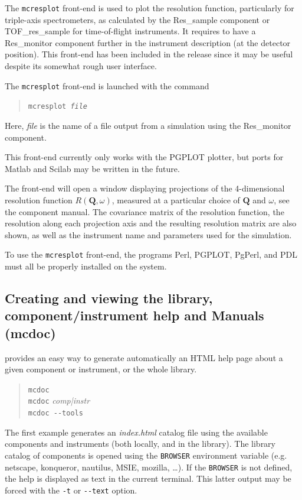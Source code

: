 The \verb+mcresplot+ front-end is used to plot the resolution function, particularly for triple-axis
spectrometers, as
calculated by the Res\_sample component or TOF\_res\_sample for
time-of-flight instruments. It requires to have a Res\_monitor component further in the instrument description (at the detector position).
This front-end
has been included in the release since it may be useful
despite its somewhat rough user interface.

The \verb+mcresplot+ front-end is launched with the command
\begin{quote}
  \texttt{mcresplot {\it file\/}}
\end{quote}
Here, {\it file\/} is the name of a file output from a simulation using
the Res\_monitor component.

This front-end currently only works with the PGPLOT plotter, but ports for Matlab and Scilab may be written in the future.

The front-end will open a window displaying projections of the 4-dimensional
resolution function $R(\boldsymbol{Q}, \omega)$, measured at a
particular choice of $\boldsymbol{Q}$ and $\omega$, see the component
manual. The covariance matrix of the
resolution function, the resolution along each projection axis and the resulting
resolution matrix are also shown, as well as the instrument name and parameters
used for the simulation.

To use the \verb+mcresplot+ front-end, the programs Perl, PGPLOT, PgPerl,
and PDL must all be properly installed on the system.

\subsection{Creating and viewing the library, component/instrument help and Manuals (mcdoc)}
\label{s:mcdoc-run}

\MCS provides an easy way to generate automatically an HTML help page about a given component or instrument, or the whole \MCS library. 
\begin{quote}
  \verb|mcdoc|\\
  \verb|mcdoc| {\it comp|instr}\\
  \verb|mcdoc --tools|
\end{quote}
The first example generates an {\it index.html} catalog file using the available components and instruments (both locally, and in the \MCS library). The library catalog of components is opened using the \verb+BROWSER+ environment variable  (e.g. netscape, konqueror, nautilus, MSIE, mozilla, \ldots). If the \verb+BROWSER+ is not defined, the help is displayed as text in the current terminal. This latter output may be forced with the \verb+-t+ or \verb+--text+ option.

